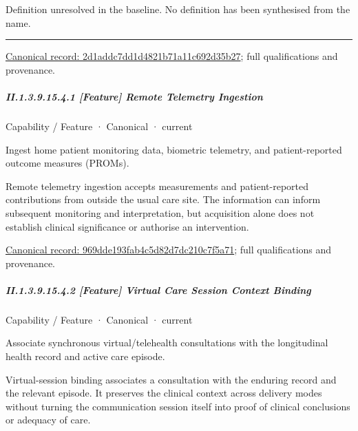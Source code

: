Definition unresolved in the baseline. No definition has been synthesised from the name.



\medskip\hrule\medskip

{\footnotesize \href{../../../../continuum/strategy/capability/2d1addc7dd1d4821b71a11c692d35b27.md}{Canonical record: 2d1addc7dd1d4821b71a11c692d35b27}; full qualifications and provenance.}\par
\subparagraph*{II.1.3.9.15.4.1 [Feature] Remote Telemetry Ingestion}
\label{navigation:II.1.3.9.15.4.1}

\label{element:969dde193fab4c5d82d7dc210c7f5a71}
{\small Capability / Feature · Canonical · current}\par

Ingest home patient monitoring data, biometric telemetry, and patient-reported outcome measures (PROMs).



Remote telemetry ingestion accepts measurements and patient-reported contributions from outside the usual care site. The information can inform subsequent monitoring and interpretation, but acquisition alone does not establish clinical significance or authorise an intervention.


{\footnotesize \href{../../../../continuum/strategy/capability/feature/969dde193fab4c5d82d7dc210c7f5a71.md}{Canonical record: 969dde193fab4c5d82d7dc210c7f5a71}; full qualifications and provenance.}\par
\subparagraph*{II.1.3.9.15.4.2 [Feature] Virtual Care Session Context Binding}
\label{navigation:II.1.3.9.15.4.2}

\label{element:c25d66fd6aff4299857eadc7c0243544}
{\small Capability / Feature · Canonical · current}\par

Associate synchronous virtual/telehealth consultations with the longitudinal health record and active care episode.



Virtual-session binding associates a consultation with the enduring record and the relevant episode. It preserves the clinical context across delivery modes without turning the communication session itself into proof of clinical conclusions or adequacy of care.


